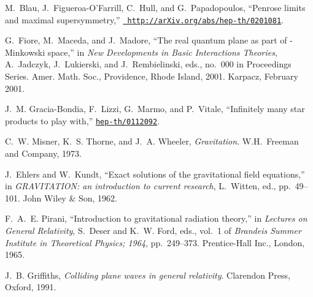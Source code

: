 \documentclass[12pt,a4paper]{article}
\newcounter{eg}
\begin{document}
\begin{thebibliography}{10}
M.~Blau, J.~Figueroa-O'Farrill, C.~Hull, and G.~Papadopoulos, ``Penrose limits
  and maximal supersymmetry,''
\href{http://xxx.lanl.gov/abs/http://arXiv.org/abs/hep-th/0201081}{{\tt
  http://arXiv.org/abs/hep-th/0201081}}.

G.~Fiore, M.~Maceda, and J.~Madore, ``The real quantum plane as part of
  \coordHE{}-{M}inkowski space,'' in {\em New Developments in Basic Interactions
  Theories}, A.~Jadczyk, J.~Lukierski, and J.~Rembielinski, eds., no.~000 in
  Proceedings Series.
\newblock Amer. Math. Soc., Providence, Rhode Island, 2001.
\newblock Karpacz, February 2001.

J.~M. Gracia-Bondia, F.~Lizzi, G.~Marmo, and P.~Vitale, ``Infinitely many star
  products to play with,''
\href{http://xxx.lanl.gov/abs/hep-th/0112092}{{\tt hep-th/0112092}}.

C.~W. Misner, K.~S. Thorne, and J.~A. Wheeler, {\em Gravitation}.
\newblock W.H.~Freeman and Company, 1973.

J.~Ehlers and W.~Kundt, ``Exact solutions of the gravitational field
  equations,'' in {\em {GRAVITATION}: an introduction to current research},
  L.~Witten, ed., pp.~49--101.
\newblock John Wiley \& Son, 1962.

F.~A.~E. Pirani, ``Introduction to gravitational radiation theory,'' in {\em
  Lectures on General Relativity}, S.~Deser and K.~W. Ford, eds., vol.~1 of
  {\em Brandeis Summer Institute in Theoretical Physics; 1964}, pp.~249--373.
\newblock Prentice-Hall Inc., London, 1965.

J.~B. Griffiths, {\em Colliding plane waves in general relativity}.
\newblock Clarendon Press, Oxford, 1991.

\end{thebibliography}\endgroup
\end{document}
